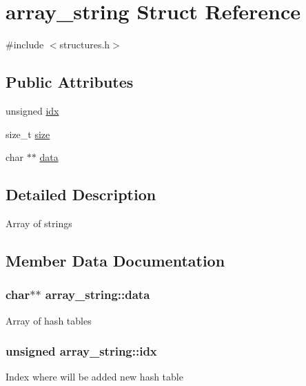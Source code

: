 \hypertarget{structarray__string}{}\section{array\+\_\+string Struct Reference}
\label{structarray__string}


{\ttfamily \#include $<$structures.\+h$>$}

\subsection*{Public Attributes}
\begin{DoxyCompactItemize}
\item 
unsigned \hyperlink{structarray__string_aa2d57de40d2c620b52744a77cdf9c342}{idx}
\item 
size\+\_\+t \hyperlink{structarray__string_a60c13969c1fb29949906ea61bb306b37}{size}
\item 
char $\ast$$\ast$ \hyperlink{structarray__string_abb507ab84fd5c9e2f585f18571faa414}{data}
\end{DoxyCompactItemize}


\subsection{Detailed Description}
Array of strings 

\subsection{Member Data Documentation}
\hypertarget{structarray__string_abb507ab84fd5c9e2f585f18571faa414}{}
\subsubsection[{data}]{\setlength{\rightskip}{0pt plus 5cm}char$\ast$$\ast$ array\+\_\+string\+::data}\label{structarray__string_abb507ab84fd5c9e2f585f18571faa414}
Array of hash tables \hypertarget{structarray__string_aa2d57de40d2c620b52744a77cdf9c342}{}
\subsubsection[{idx}]{\setlength{\rightskip}{0pt plus 5cm}unsigned array\+\_\+string\+::idx}\label{structarray__string_aa2d57de40d2c620b52744a77cdf9c342}
Index where will be added new hash table \hypertarget{structarray__string_a60c13969c1fb29949906ea61bb306b37}{}
